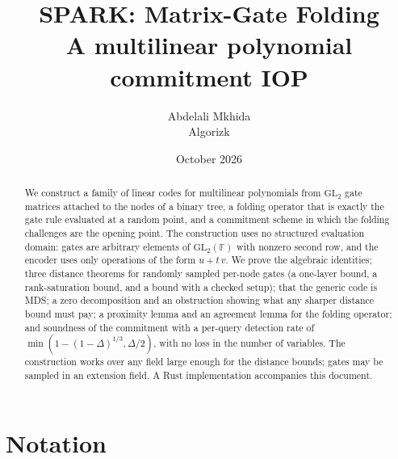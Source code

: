 \documentclass[11pt]{article}
\title{SPARK: Matrix-Gate Folding\\[2pt]
\large A multilinear polynomial commitment IOP}
\author{Abdelali Mkhida \\ Algorizk}
\date{October 2026}
\theoremstyle{definition}
\newcommand{\F}{\mathbb{F}}
\newcommand{\GL}{\mathrm{GL}}
\begin{document}
\maketitle

\begin{abstract}
We construct a family of linear codes for multilinear polynomials from $\GL_2$ gate matrices
attached to the nodes of a binary tree, a folding operator that is exactly the gate rule
evaluated at a random point, and a commitment scheme in which the folding challenges are the
opening point. The construction uses no structured evaluation domain: gates are arbitrary
elements of $\GL_2(\F)$ with nonzero second row, and the encoder uses only operations of the
form $u+t\,v$. We prove the algebraic identities; three distance theorems for randomly sampled per-node gates
(a one-layer bound, a rank-saturation bound, and a bound with a checked setup); that the generic
code is MDS; a zero decomposition and an obstruction showing what any sharper distance bound must
pay; a proximity lemma and an agreement lemma for the folding operator; and soundness of the
commitment with a per-query detection rate of $\min(1-(1-\Delta)^{1/3},\Delta/2)$, with no loss
in the number of variables. The construction works over any field large enough for the distance
bounds; gates may be sampled in an extension field. A Rust implementation accompanies this
document.
\end{abstract}

\tableofcontents

\section{Notation}
\end{document}
